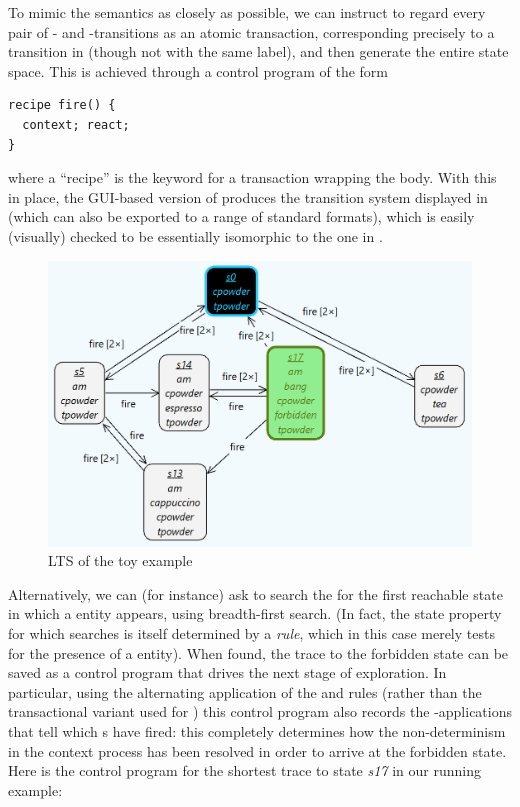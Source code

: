 To mimic the \BioResolve semantics as closely as possible, we can instruct \GROOVE to regard every pair of \contextR- and \reactR-transitions as an atomic transaction, corresponding precisely to a transition in \BioResolve (though not with the same label), and then generate the entire state space. This is achieved through a control program of the form
%
\begin{lstlisting}[keywordstyle=\bfseries,morekeywords={recipe}]
recipe fire() {
  context; react;
}
\end{lstlisting}
%
where a ``recipe'' is the keyword for a transaction wrapping the body. With this in place, the GUI-based version of \GROOVE produces the transition system displayed in  (which can also be exported to a range of standard formats), which is easily (visually) checked to be essentially isomorphic to the one in .

\begin{figure}
\centering
\includegraphics[scale=.2]{figs/toy-gts}
\caption{\GROOVE LTS of the toy example}
\label{fig:toy-gts}
\end{figure}

Alternatively, we can (for instance) ask \GROOVE to search the for the first reachable state in which a \Forbidden entity appears, using breadth-first search. (In fact, the state property for which \GROOVE searches is itself determined by a \emph{rule}, which in this case merely tests for the presence of a \Forbidden entity). When found, the trace to the forbidden state can be saved as a control program that drives the next stage of \GROOVE exploration. In particular, using the alternating application of the \contextR and \reactR rules (rather than the transactional variant used for ) this control program also records the \firedR-applications that tell which \Step{}s have fired: this completely determines how the non-determinism in the context process has been resolved in order to arrive at the forbidden state. Here is the control program for the shortest trace to state \textsf{\itshape s17} in our running example:

